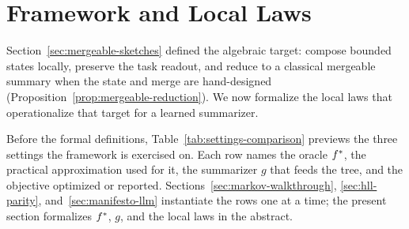 \section{Framework and Local Laws}\label{sec:framework}

Section~\ref{sec:mergeable-sketches} defined the algebraic target:
compose bounded states locally, preserve the task readout, and reduce to a
classical mergeable summary when the state and merge are hand-designed
(Proposition~\ref{prop:mergeable-reduction}). We now formalize the local
laws that operationalize that target for a learned summarizer.

Before the formal definitions, Table~\ref{tab:settings-comparison} previews the three settings the framework is exercised on. Each row names the oracle $f^\ast$, the practical approximation used for it, the summarizer $g$ that feeds the tree, and the objective optimized or reported. Sections~\ref{sec:markov-walkthrough}, \ref{sec:hll-parity}, and~\ref{sec:manifesto-llm} instantiate the rows one at a time; the present section formalizes $f^\ast$, $g$, and the local laws in the abstract.

